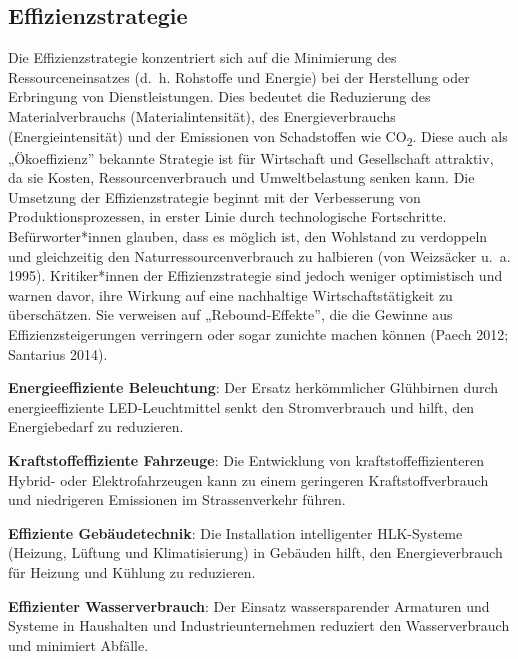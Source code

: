 \documentclass[
  nswissgerman,
  a4paper,
  openany]{book}
\begin{document}
\subsection{Effizienzstrategie}\label{effizienzstrategie}

Die Effizienzstrategie konzentriert sich auf die Minimierung des
Ressourceneinsatzes (d.~h. Rohstoffe und Energie) bei der Herstellung
oder Erbringung von Dienstleistungen. Dies bedeutet die Reduzierung des
Materialverbrauchs (Materialintensität), des Energieverbrauchs
(Energieintensität) und der Emissionen von Schadstoffen wie
CO\textsubscript{2}. Diese auch als „Ökoeffizienz'' bekannte Strategie
ist für Wirtschaft und Gesellschaft attraktiv, da sie Kosten,
Ressourcenverbrauch und Umweltbelastung senken kann. Die Umsetzung der
Effizienzstrategie beginnt mit der Verbesserung von
Produktionsprozessen, in erster Linie durch technologische Fortschritte.
Befürworter*innen glauben, dass es möglich ist, den Wohlstand zu
verdoppeln und gleichzeitig den Naturressourcenverbrauch zu halbieren
({von Weizsäcker u.~a.} 1995). Kritiker*innen der Effizienzstrategie
sind jedoch weniger optimistisch und warnen davor, ihre Wirkung auf eine
nachhaltige Wirtschaftstätigkeit zu überschätzen. Sie verweisen auf
„Rebound-Effekte'', die die Gewinne aus Effizienzsteigerungen verringern
oder sogar zunichte machen können (Paech 2012; Santarius 2014).

\begin{tcolorbox}[enhanced jigsaw, arc=.35mm, bottomrule=.15mm, bottomtitle=1mm, breakable, colback=white, colbacktitle=quarto-callout-tip-color!10!white, colframe=quarto-callout-tip-color-frame, coltitle=black, left=2mm, leftrule=.75mm, opacityback=0, opacitybacktitle=0.6, rightrule=.15mm, title={Effizienzstrategien in der Praxis: Beispiele}, titlerule=0mm, toprule=.15mm, toptitle=1mm]

\textbf{Energieeffiziente Beleuchtung}: Der Ersatz herkömmlicher
Glühbirnen durch energieeffiziente LED-Leuchtmittel senkt den
Stromverbrauch und hilft, den Energiebedarf zu reduzieren.

\textbf{Kraftstoffeffiziente Fahrzeuge}: Die Entwicklung von
kraftstoffeffizienteren Hybrid- oder Elektrofahrzeugen kann zu einem
geringeren Kraftstoffverbrauch und niedrigeren Emissionen im
Strassenverkehr führen.

\textbf{Effiziente Gebäudetechnik}: Die Installation intelligenter
HLK-Systeme (Heizung, Lüftung und Klimatisierung) in Gebäuden hilft, den
Energieverbrauch für Heizung und Kühlung zu reduzieren.

\textbf{Effizienter Wasserverbrauch}: Der Einsatz wassersparender
Armaturen und Systeme in Haushalten und Industrieunternehmen reduziert
den Wasserverbrauch und minimiert Abfälle.

\end{tcolorbox}
\end{document}
